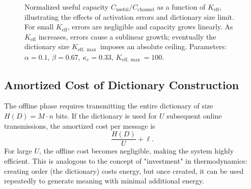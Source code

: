 \documentclass[12pt,a4paper]{article}
\theoremstyle{remark}
\newcommand{\Keff}{K_{\mathrm{eff}}}
\newcommand{\kappac}{\kappa_c}
\newcommand{\Keffmax}{K_{\mathrm{eff},\max}}
\begin{document}
	\begin{figure}[htbp]
		\centering
		\caption{Normalized useful capacity $C_{\text{useful}}/C_{\text{channel}}$ as a function of $\Keff$, illustrating the effects of activation errors and dictionary size limit. For small $\Keff$, errors are negligible and capacity grows linearly. As $\Keff$ increases, errors cause a sublinear growth; eventually the dictionary size $\Keffmax$ imposes an absolute ceiling. Parameters: $\alpha=0.1$, $\beta=0.67$, $\kappa_c=0.33$, $\Keffmax=100$.}
		\label{fig:useful-capacity}
	\end{figure}
	
	\subsection{Amortized Cost of Dictionary Construction}
	
	The offline phase requires transmitting the entire dictionary of size $H(D) = M \cdot n$ bits. If the dictionary is used for $U$ subsequent online transmissions, the amortized cost per message is
	\[
	\frac{H(D)}{U} + \ell.
	\]
	For large $U$, the offline cost becomes negligible, making the system highly efficient. This is analogous to the concept of "investment" in thermodynamics: creating order (the dictionary) costs energy, but once created, it can be used repeatedly to generate meaning with minimal additional energy.
	
\end{document}
